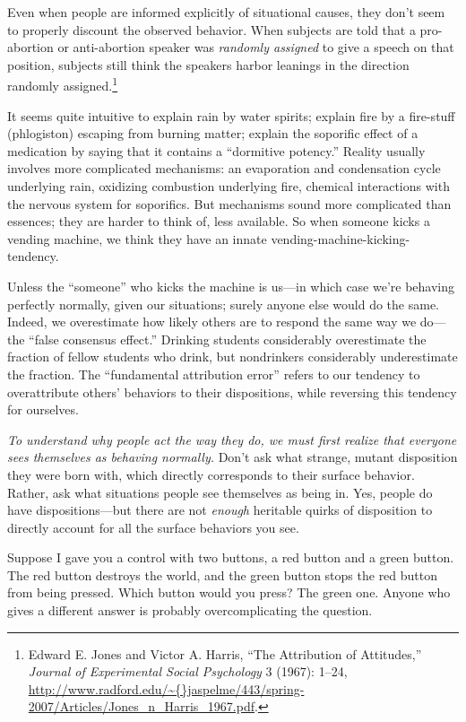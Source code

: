 {
 Even when people are informed explicitly of situational causes,
they don't seem to properly discount the observed
behavior. When subjects are told that a pro-abortion or anti-abortion
speaker was \textit{randomly assigned} to give a speech on that
position, subjects still think the speakers harbor leanings in the
direction randomly assigned.\footnote{Edward E. Jones and Victor A. Harris, ``The
Attribution of Attitudes,'' \textit{Journal of
Experimental Social Psychology} 3 (1967): 1--24,
\url{http://www.radford.edu/\~{}jaspelme/443/spring-2007/Articles/Jones\_n\_Harris\_1967.pdf}.}}

{
 It seems quite intuitive to explain rain by water spirits; explain
fire by a fire-stuff (phlogiston) escaping from burning matter; explain
the soporific effect of a medication by saying that it contains a
``dormitive potency.'' Reality
usually involves more complicated mechanisms: an evaporation and
condensation cycle underlying rain, oxidizing combustion underlying
fire, chemical interactions with the nervous system for soporifics. But
mechanisms sound more complicated than essences; they are harder to
think of, less available. So when someone kicks a vending machine, we
think they have an innate vending-machine-kicking-tendency.}

{
 Unless the ``someone'' who
kicks the machine is us---in which case we're behaving
perfectly normally, given our situations; surely anyone else would do
the same. Indeed, we overestimate how likely others are to respond the
same way we do---the ``false consensus
effect.'' Drinking students considerably overestimate
the fraction of fellow students who drink, but nondrinkers considerably
underestimate the fraction. The ``fundamental
attribution error'' refers to our tendency to
overattribute others' behaviors to their dispositions,
while reversing this tendency for ourselves.}

{
 \textit{To understand why people act the way they do, we must
first realize that everyone sees themselves as behaving normally.}
Don't ask what strange, mutant disposition they were
born with, which directly corresponds to their surface behavior.
Rather, ask what situations people see themselves as being in. Yes,
people do have dispositions---but there are not \textit{enough}
heritable quirks of disposition to directly account for all the surface
behaviors you see.}

{
 Suppose I gave you a control with two buttons, a red button and a
green button. The red button destroys the world, and the green button
stops the red button from being pressed. Which button would you press?
The green one. Anyone who gives a different answer is probably
overcomplicating the question.}

